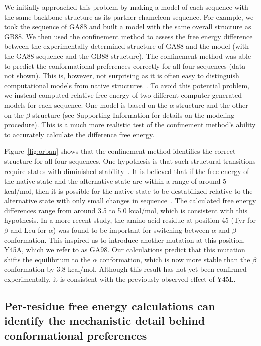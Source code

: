\documentclass[12pt]{article}
\begin{document}
We initially approached this problem by making a model of each sequence with the same backbone structure as its partner
chameleon sequence. For example, we took the sequence of GA88 and built a model with the same overall structure as GB88.
We then used the confinement method to assess the free energy difference between the experimentally determined structure
of GA88 and the model (with the GA88 sequence and the GB88 structure). The confinement method was able to predict the
conformational preferences correctly for all four sequences (data not shown). This is, however, not surprising as it is
often easy to distinguish computational models from native structures~\cite{Handl2009,Sheffler2009}. To avoid this
potential problem, we instead computed relative free energy of two different computer generated models for each
sequence. One model is based on the $\alpha$ structure and the other on the $\beta$ structure (see Supporting
Information for details on the modeling procedure). This is a much more realistic test of the confinement method's
ability to accurately calculate the difference free energy.

Figure~\ref{fig:orban} shows that the confinement method identifies the correct structure for all four sequences. One
hypothesis is that such structural transitions require states with diminished stability~\cite{Bryan2010}. It is believed
that if the free energy of the native state and the alternative state are within a range of around 5 kcal/mol, then it
is possible for the native state to be destabilized relative to the alternative state with only small changes in
sequence~\cite{He2008,Alexander2009,Bryan2010}. The calculated free energy differences range from around 3.5 to 5.0
kcal/mol, which is consistent with this hypothesis. In a more recent study\cite{He2012}, the amino acid residue at
position 45 (Tyr for $\beta$ and Leu for $\alpha$) was found to be important for switching between $\alpha$ and $\beta$
conformation. This inspired us to introduce another mutation at this position, Y45A, which we refer to as GA98. Our
calculations predict that this mutation shifts the equilibrium to the $\alpha$ conformation, which is now more stable
than the $\beta$ conformation by 3.8 kcal/mol. Although this result has not yet been confirmed experimentally, it is
consistent with the previously observed effect of Y45L.

\subsection*{Per-residue free energy calculations can identify the mechanistic detail behind conformational preferences}
\end{document}
